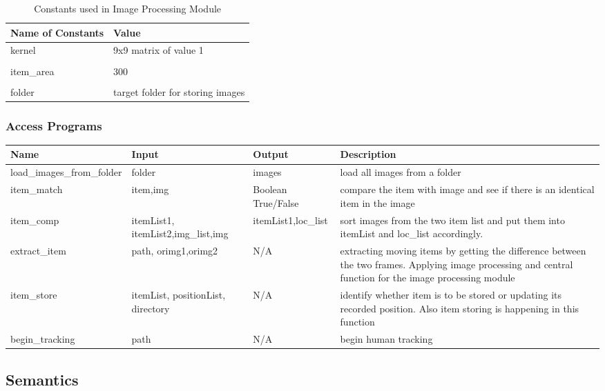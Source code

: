 \documentclass[12pt, titlepage]{article}
\begin{document}
\begin{table}[H]
\caption{Constants used in Image Processing Module} 
\begin{tabularx}{\textwidth}{XX}
\toprule
\textbf{Name of Constants} & \textbf{Value}\\
\midrule
kernel & 9x9 matrix of value 1\\\\
item\_area & 300\\\\
folder & target folder for storing images\\

\bottomrule
\end{tabularx}
\end{table}



\subsubsection{Access Programs}

\begin{center}
\begin{tabular}{|l|l|l| p{7cm} |}
\hline
\textbf{Name} & \textbf{Input} & \textbf{Output} & \textbf{Description}  \\
\hline
load\_images\_from\_folder & folder & images & load all images from a folder\\
\hline
item\_match & item,img & Boolean True/False & compare the item with image and see if there is an identical item in the image\\
\hline
item\_comp & itemList1, itemList2,img\_list,img & itemList1,loc\_list & sort images from the two item list and put them into itemList and loc\_list accordingly.\\
\hline
extract\_item & path, orimg1,orimg2 & N/A & extracting moving items by getting the difference between the two frames. Applying image processing and central function for the image processing module \\
\hline
item\_store & itemList, positionList, directory & N/A & identify whether item is to be stored or updating its recorded position. Also item storing is happening in this function \\
\hline
begin\_tracking & path & N/A & begin human tracking  \\
\hline
\end{tabular}
\end{center}

\subsection{Semantics}
\end{document}
